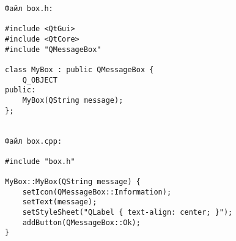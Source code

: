 \begin{verbatim}
Файл box.h:

#include <QtGui>
#include <QtCore>
#include "QMessageBox"

class MyBox : public QMessageBox {
    Q_OBJECT
public:
    MyBox(QString message);
};


Файл box.cpp:

#include "box.h"

MyBox::MyBox(QString message) {
    setIcon(QMessageBox::Information);
    setText(message);
    setStyleSheet("QLabel { text-align: center; }");
    addButton(QMessageBox::Ok);
}
\end{verbatim}
